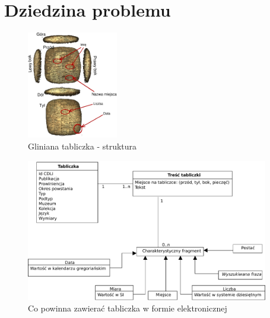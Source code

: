 \chapter{Dziedzina problemu}

\begin{figure}
 \centering
 \includegraphics[width=150px]{../diagramy/tabliczka.pdf}
 \caption{Gliniana tabliczka - struktura}
\end{figure}



\begin{figure}
 \centering
 \includegraphics[width=400px]{../diagramy/Model-dziedziny.pdf}
 \caption{Co powinna zawierać tabliczka w formie elektronicznej}
\end{figure}
~ 

